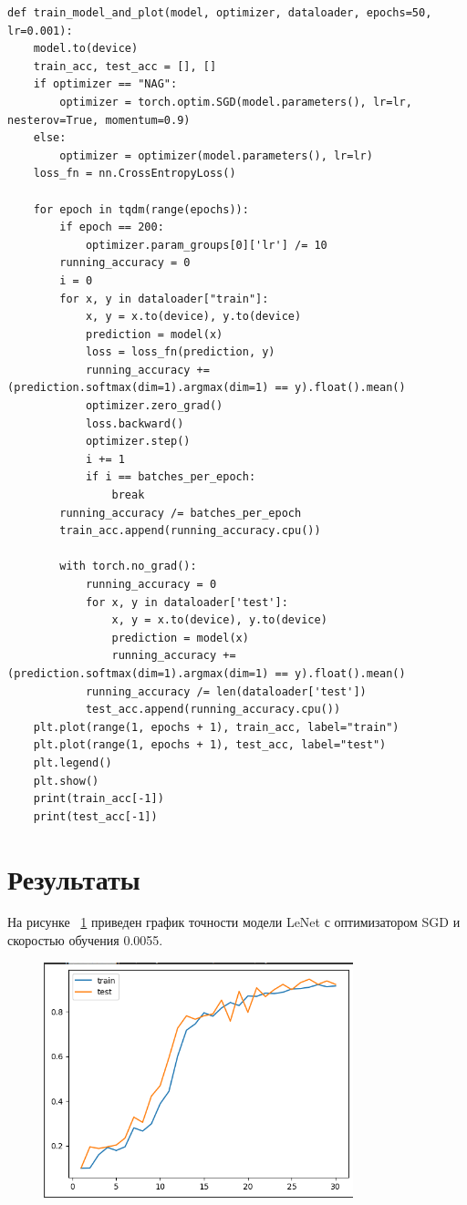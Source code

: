 \documentclass[a4paper, 14pt]{extarticle}
\begin{document}
\begin{lstlisting}[language={},caption={Обучение модели},label={lst:code5}, breaklines=true]
def train_model_and_plot(model, optimizer, dataloader, epochs=50, lr=0.001):
    model.to(device)
    train_acc, test_acc = [], []
    if optimizer == "NAG":
        optimizer = torch.optim.SGD(model.parameters(), lr=lr, nesterov=True, momentum=0.9)
    else:
        optimizer = optimizer(model.parameters(), lr=lr)
    loss_fn = nn.CrossEntropyLoss()

    for epoch in tqdm(range(epochs)):
        if epoch == 200:
            optimizer.param_groups[0]['lr'] /= 10
        running_accuracy = 0
        i = 0
        for x, y in dataloader["train"]:
            x, y = x.to(device), y.to(device)
            prediction = model(x)
            loss = loss_fn(prediction, y)
            running_accuracy += (prediction.softmax(dim=1).argmax(dim=1) == y).float().mean()
            optimizer.zero_grad()
            loss.backward()
            optimizer.step()
            i += 1
            if i == batches_per_epoch:
                break
        running_accuracy /= batches_per_epoch
        train_acc.append(running_accuracy.cpu())

        with torch.no_grad():
            running_accuracy = 0
            for x, y in dataloader['test']:
                x, y = x.to(device), y.to(device)
                prediction = model(x)
                running_accuracy += (prediction.softmax(dim=1).argmax(dim=1) == y).float().mean()
            running_accuracy /= len(dataloader['test'])
            test_acc.append(running_accuracy.cpu())
    plt.plot(range(1, epochs + 1), train_acc, label="train")
    plt.plot(range(1, epochs + 1), test_acc, label="test")
    plt.legend()
    plt.show()
    print(train_acc[-1])
    print(test_acc[-1])
\end{lstlisting}

\section{Результаты}

На рисунке ~\ref{fig:img1} приведен график точности модели LeNet с оптимизатором SGD и скоростью обучения 0.0055.

\begin{figure}[H]
\centering
\includegraphics[width=0.8\textwidth]{images/res1.png}
\caption{}
\label{fig:img1}
\end{figure}
\end{document}
